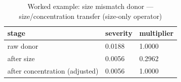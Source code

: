 \begin{table}[htbp]
\centering
\caption{Worked example: size mismatch donor --- size/concentration transfer (size-only operator)}
\label{tab:v2_we_size_mismatch}
\begin{tabular}{lll}
\toprule
\textbf{stage} & \textbf{severity} & \textbf{multiplier} \\
\midrule
raw donor & 0.0188 & 1.0000 \\
after size & 0.0056 & 0.2962 \\
after concentration (adjusted) & 0.0056 & 1.0000 \\
\bottomrule
\end{tabular}
\end{table}
